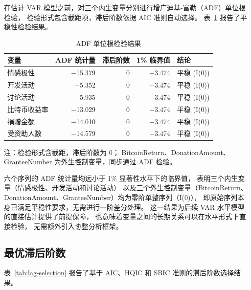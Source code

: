 \documentclass[
    type = master, %
    degree = professional,        %
    decl-page,  %
    twoside,                %
    fontset = fandol %
  ]{njuthesis}
\renewcommand{\footnotesize}{\zihao{-5}}
\begin{document}
在估计 VAR 模型之前，对三个内生变量分别进行增广迪基-富勒（ADF）单位根检验，
检验形式包含截距项，滞后阶数依据 AIC 准则自动选择。
表~\ref{tab:adf-test} 报告了平稳性检验结果。

\begin{table}[htbp]
    \centering
    \small
    \caption{ADF 单位根检验结果}
    \label{tab:adf-test}
    \begin{tabularx}{\textwidth}{Xrrrp{3cm}}
        \toprule
        变量 & ADF 统计量 & 滞后阶数 & 1\% 临界值 & 结论 \\
        \midrule
        情感极性 & $-$15.379 & 0 & $-$3.474 & 平稳 (I(0)) \\
        开发活动      & $-$5.352  & 0 & $-$3.474 & 平稳 (I(0)) \\
        讨论活动   & $-$5.935  & 0 & $-$3.474 & 平稳 (I(0)) \\
        比特币收益率    & $-$13.029 & 0 & $-$3.474 & 平稳 (I(0)) \\
        捐赠金额  & $-$14.010 & 0 & $-$3.474 & 平稳 (I(0)) \\
        受资助人数     & $-$14.579 & 0 & $-$3.474 & 平稳 (I(0)) \\
        \bottomrule
    \end{tabularx}
    \begin{minipage}{\textwidth}
        \vspace{0.3em}
        \footnotesize 注：检验形式含截距，滞后阶数为 0；
        BitcoinReturn、DonationAmount、GranteeNumber 为外生控制变量，同步通过 ADF 检验。
    \end{minipage}
\end{table}

六个序列的 ADF 统计量均远小于 1\% 显著性水平下的临界值，
表明三个内生变量（情感极性、开发活动和讨论活动）
以及三个外生控制变量（BitcoinReturn、DonationAmount、GranteeNumber）均为零阶单整序列（I(0)），
即原始序列本身已满足平稳性要求，无需进行一阶差分处理。
这一结果为后续 VAR 水平模型的直接估计提供了前提保障，
也意味着变量之间的长期关系可以在水平形式下直接检验，
无需额外引入协整分析框架。

\subsection{最优滞后阶数}

表~\ref{tab:lag-selection} 报告了基于 AIC、HQIC 和 SBIC 准则的滞后阶数选择结果。
\end{document}
